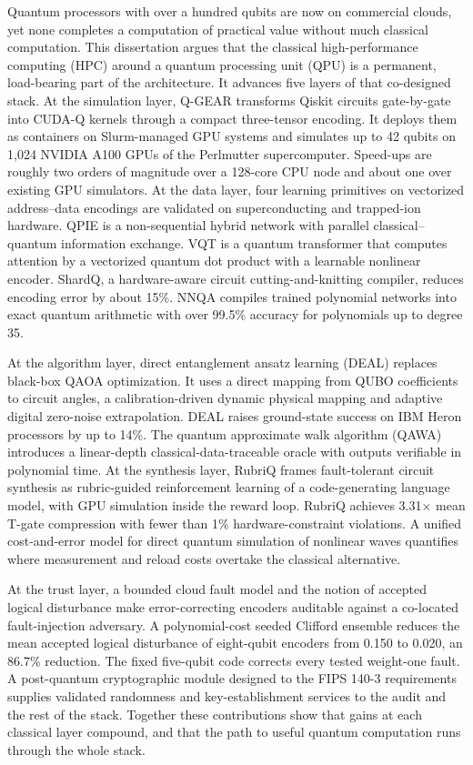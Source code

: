\begin{ttuabstract}
Quantum processors with over a hundred qubits are now on commercial clouds, yet none completes a computation of practical value without much classical computation. This dissertation argues that the classical high-performance computing (HPC) around a quantum processing unit (QPU) is a permanent, load-bearing part of the architecture. It advances five layers of that co-designed stack. At the simulation layer, Q-GEAR transforms Qiskit circuits gate-by-gate into CUDA-Q kernels through a compact three-tensor encoding. It deploys them as containers on Slurm-managed GPU systems and simulates up to 42 qubits on 1,024 NVIDIA A100 GPUs of the Perlmutter supercomputer. Speed-ups are roughly two orders of magnitude over a 128-core CPU node and about one over existing GPU simulators. At the data layer, four learning primitives on vectorized address--data encodings are validated on superconducting and trapped-ion hardware. QPIE is a non-sequential hybrid network with parallel classical--quantum information exchange. VQT is a quantum transformer that computes attention by a vectorized quantum dot product with a learnable nonlinear encoder. ShardQ, a hardware-aware circuit cutting-and-knitting compiler, reduces encoding error by about 15\%. NNQA compiles trained polynomial networks into exact quantum arithmetic with over 99.5\% accuracy for polynomials up to degree 35.

At the algorithm layer, direct entanglement ansatz learning (DEAL) replaces black-box QAOA optimization. It uses a direct mapping from QUBO coefficients to circuit angles, a calibration-driven dynamic physical mapping and adaptive digital zero-noise extrapolation. DEAL raises ground-state success on IBM Heron processors by up to 14\%. The quantum approximate walk algorithm (QAWA) introduces a linear-depth classical-data-traceable oracle with outputs verifiable in polynomial time. At the synthesis layer, RubriQ frames fault-tolerant circuit synthesis as rubric-guided reinforcement learning of a code-generating language model, with GPU simulation inside the reward loop. RubriQ achieves 3.31$\times$ mean T-gate compression with fewer than 1\% hardware-constraint violations. A unified cost-and-error model for direct quantum simulation of nonlinear waves quantifies where measurement and reload costs overtake the classical alternative.

At the trust layer, a bounded cloud fault model and the notion of accepted logical disturbance make error-correcting encoders auditable against a co-located fault-injection adversary. A polynomial-cost seeded Clifford ensemble reduces the mean accepted logical disturbance of eight-qubit encoders from 0.150 to 0.020, an 86.7\% reduction. The fixed five-qubit code corrects every tested weight-one fault. A post-quantum cryptographic module designed to the FIPS 140-3 requirements supplies validated randomness and key-establishment services to the audit and the rest of the stack. Together these contributions show that gains at each classical layer compound, and that the path to useful quantum computation runs through the whole stack.
\end{ttuabstract}
